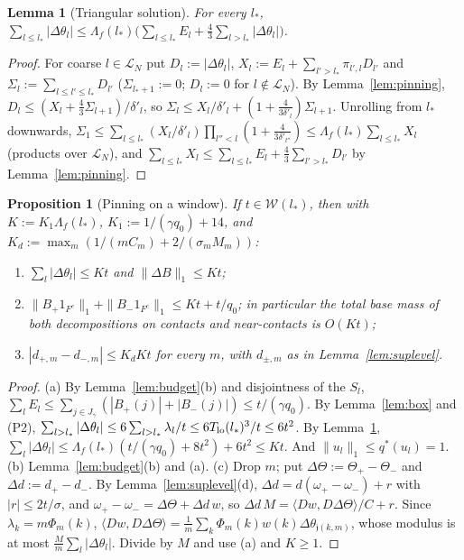 \documentclass[10pt]{amsart}
\newtheorem{lemma}[theorem]{Lemma}
\newtheorem{proposition}[theorem]{Proposition}
\theoremstyle{definition}
\theoremstyle{remark}
\newcommand{\ip}[2]{\langle #1,#2\rangle}
\begin{document}
\begin{lemma}[Triangular solution]\label{lem:triangular}
For every $l_*$,
$\displaystyle\sum_{l\le l_*}|\Delta\theta_l|\le\Lambda_f(l_*)\Big(\sum_{l\le
l_*}E_l+\frac43\sum_{l>l_*}|\Delta\theta_l|\Big)$.
\end{lemma}

\begin{proof}
For coarse $l\in\mathcal L_N$ put $D_l:=|\Delta\theta_l|$, $X_l:=E_l+
\sum_{l'>l_*}\pi_{l',l}D_{l'}$ and $\Sigma_l:=\sum_{l\le l'\le l_*}D_{l'}$
($\Sigma_{l_*+1}:=0$; $D_l:=0$ for $l\notin\mathcal L_N$).  By
Lemma~\ref{lem:pinning}, $D_l\le(X_l+\frac43\Sigma_{l+1})/\delta'_l$, so
$\Sigma_l\le X_l/\delta'_l+(1+\frac4{3\delta'_l})\Sigma_{l+1}$.  Unrolling
from $l_*$ downwards, $\Sigma_1\le\sum_{l\le l_*}(X_l/\delta'_l)\prod_{l''<l}
(1+\frac4{3\delta'_{l''}})\le\Lambda_f(l_*)\sum_{l\le l_*}X_l$ (products over
$\mathcal L_N$), and $\sum_{l\le l_*}X_l\le\sum_{l\le l_*}E_l+\frac43
\sum_{l'>l_*}D_{l'}$ by Lemma~\ref{lem:pinning}.
\end{proof}

\begin{proposition}[Pinning on a window]\label{prop:pinned}
If $t\in\mathcal W(l_*)$, then with $K:=K_1\Lambda_f(l_*)$,
$K_1:=1/(\gamma q_0)+14$, and $K_d:=\max_m(1/(mC_m)+2/(\sigma_mM_m))$:
\begin{enumerate}
\item[(a)] $\sum_l|\Delta\theta_l|\le Kt$ and $\|\Delta B\|_1\le Kt$;
\item[(b)] $\|B_+1_{F^c}\|_1+\|B_-1_{F^c}\|_1\le Kt+t/q_0$; in particular the
total base mass of both decompositions on contacts and near-contacts is
$O(Kt)$;
\item[(c)] $|d_{+,m}-d_{-,m}|\le K_dKt$ for every $m$, with $d_{\pm,m}$ as in
Lemma~\ref{lem:suplevel}.
\end{enumerate}
\end{proposition}

\begin{proof}
(a) By Lemma~\ref{lem:budget}(b) and disjointness of the $S_l$,
$\sum_lE_l\le\sum_{j\in J_\gamma}(|B_+(j)|+|B_-(j)|)\le t/(\gamma q_0)$.  By
Lemma~\ref{lem:box} and (P2), $\sum_{l>l_*}|\Delta\theta_l|\le6\sum_{l>l_*}
\lambda_l/t\le6T_{\rm lo}(l_*)^3/t\le6t^2$.  By Lemma~\ref{lem:triangular},
$\sum_l|\Delta\theta_l|\le\Lambda_f(l_*)(t/(\gamma q_0)+8t^2)+6t^2\le Kt$.  And
$\|u_l\|_1\le q^*(u_l)=1$.  (b) Lemma~\ref{lem:budget}(b) and (a).
(c) Drop $m$; put $\Delta\Theta:=\Theta_+-\Theta_-$ and $\Delta d:=d_+-d_-$.
By Lemma~\ref{lem:suplevel}(d), $\Delta d=d(\omega_+-\omega_-)+r$ with
$|r|\le2t/\sigma$, and $\omega_+-\omega_-=\Delta\Theta+\Delta d\,w$, so
$\Delta d\,M=\ip{Dw}{D\Delta\Theta}/C+r$.  Since $\lambda_k=m\Phi_m(k)$,
$\ip{Dw}{D\Delta\Theta}=\frac1m\sum_k\Phi_m(k)w(k)\Delta\theta_{\mathfrak j(k,m)}$,
whose modulus is at most $\frac Mm\sum_l|\Delta\theta_l|$.  Divide by $M$ and
use (a) and $K\ge1$.
\end{proof}
\end{document}
